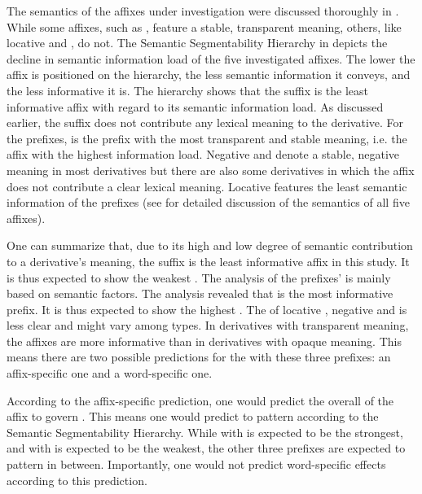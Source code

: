 The semantics of the affixes under investigation were discussed thoroughly in . While some affixes, such as , feature a stable, transparent meaning, others, like locative  and , do not. The Semantic Segmentability Hierarchy in  depicts the decline in semantic information load of the five investigated affixes.
 The lower the affix is positioned on the hierarchy, the less semantic information it conveys, and the less informative it is. The hierarchy shows that the suffix  is the least informative affix with regard to its semantic information load.  As discussed earlier, the suffix does not contribute any lexical meaning to the derivative. 
 For the prefixes,  is the prefix with the most transparent and stable meaning, i.e. the affix with the highest information load. Negative  and  denote a stable, negative meaning in most derivatives but there are also some derivatives in which the affix does not contribute a clear lexical meaning. Locative  features the least semantic information of the prefixes (see  for detailed discussion of the semantics of all five affixes). 

One can summarize that, due to its high  and low degree of semantic contribution to a derivative's meaning, the suffix  is the least informative affix in this study. It is thus expected to show the weakest . 
The analysis of the prefixes'  is mainly based on semantic factors. 
The analysis revealed that  is the most informative prefix. It is thus expected to show the highest . 
The  of locative , negative  and  is less clear and might vary among types. In derivatives with transparent meaning, the affixes are more informative than in derivatives with opaque meaning. This means there are two possible predictions for the  with these three prefixes: an affix-specific one and a word-specific one. 

According to the affix-specific prediction, one would predict the overall  of the affix to govern . This means one would predict  to pattern according to the Semantic Segmentability Hierarchy. While  with  is expected to be the strongest, and  with  is expected to be the weakest, the other three prefixes are expected to pattern in between. Importantly, one would not predict word-specific effects according to this prediction. 

